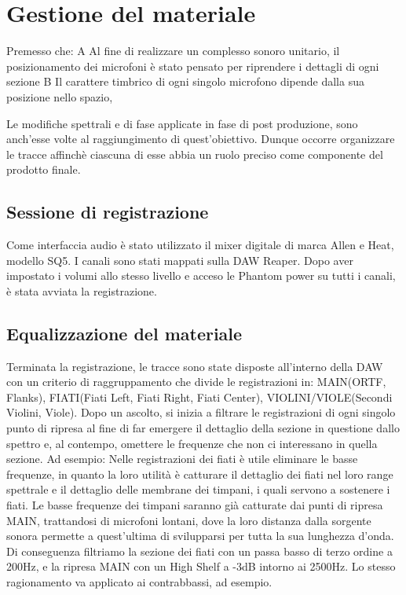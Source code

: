 \section*{Gestione del materiale}
Premesso che:
A Al fine di realizzare un complesso sonoro unitario, il posizionamento dei microfoni è stato pensato per riprendere i dettagli di ogni sezione
B Il carattere timbrico di ogni singolo microfono dipende dalla sua posizione nello spazio,

Le modifiche spettrali e di fase applicate in fase di post produzione, sono anch'esse volte al raggiungimento di quest'obiettivo.
Dunque occorre organizzare le tracce affinchè ciascuna di esse abbia un ruolo preciso come componente del prodotto finale.

\subsection*{Sessione di registrazione}
Come interfaccia audio è stato utilizzato il mixer digitale di marca Allen e Heat, modello SQ5. I canali sono stati mappati sulla DAW Reaper. Dopo aver impostato i volumi allo stesso livello e acceso le Phantom power su tutti i canali, è stata avviata la registrazione.

\subsection*{Equalizzazione del materiale}
Terminata la registrazione, le tracce sono state disposte all'interno della DAW con un criterio di raggruppamento che divide le registrazioni in: MAIN(ORTF, Flanks), FIATI(Fiati Left, Fiati Right, Fiati Center), VIOLINI/VIOLE(Secondi Violini, Viole).
Dopo un ascolto, si inizia a filtrare le registrazioni di ogni singolo punto di ripresa al fine di far emergere il dettaglio della sezione in questione dallo spettro e, al contempo, omettere le frequenze che non ci interessano in quella sezione.
Ad esempio: Nelle registrazioni dei fiati è utile eliminare le basse frequenze, in quanto la loro utilità è catturare il dettaglio dei fiati nel loro range spettrale e il dettaglio delle membrane dei timpani, i quali servono a sostenere i fiati. Le basse frequenze dei timpani saranno già catturate dai punti di ripresa MAIN, trattandosi di microfoni lontani, dove la loro distanza dalla sorgente sonora permette a quest'ultima di svilupparsi per tutta la sua lunghezza d'onda.
Di conseguenza filtriamo la sezione dei fiati con un passa basso di terzo ordine a 200Hz, e la ripresa MAIN con un High Shelf a -3dB intorno ai 2500Hz.
Lo stesso ragionamento va applicato ai contrabbassi, ad esempio.

